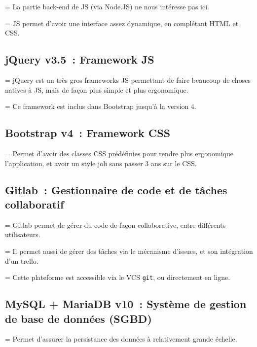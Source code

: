 \hangindent=\parindent%
La partie back-end de JS (via Node.JS) ne nous intéresse pas ici.

\hangindent=\parindent%
JS permet d'avoir une interface assez dynamique, en complétant HTML et CSS.
          
\subsection*{jQuery v3.5~: Framework JS}
    
\hangindent=\parindent%
jQuery est un très gros frameworks JS permettant de faire beaucoup de choses natives à JS, mais de façon plus simple et plus ergonomique.

\hangindent=\parindent%
Ce framework est inclus dans Bootstrap jusqu'à la version 4.

\subsection*{Bootstrap v4~: Framework CSS}
          
\hangindent=\parindent%
Permet d'avoir des classes CSS prédéfinies pour rendre plus ergonomique l'application, et avoir un style joli sans passer 3 ans sur le CSS.
          
\subsection*{Gitlab~: Gestionnaire de code et de tâches collaboratif}
    
\hangindent=\parindent%
Gitlab permet de gérer du code de façon collaborative, entre différents utilisateurs.

\hangindent=\parindent%
Il permet aussi de gérer des tâches via le mécanisme d'issues, et son intégration d'un trello.

\hangindent=\parindent%
Cette plateforme est accessible via le VCS \texttt{git}, ou directement en ligne.
    
\subsection*{MySQL + MariaDB v10~: Système de gestion de base de données (SGBD)}
    
\hangindent=\parindent%
Permet d'assurer la persistance des données à relativement grande échelle.